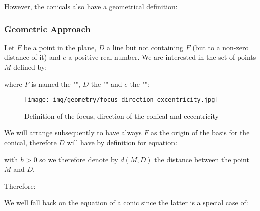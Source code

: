 	However, the conicals also have a geometrical definition:
	
	\pagebreak
	\subsubsection{Geometric Approach}
	Let $F$ be a point in the plane, $D$ a line but not containing $F$ (but to a non-zero distance of it) and $e$ a positive real number. We are interested in the set of points $M$ defined by:
	
	where $F$ is named the "", $D$ the "" and $e$ the "\label{eccentricity}":
	\begin{figure}[H]
		\centering
		\texttt{[image: img/geometry/focus\_direction\_excentricity.jpg]}
		\caption{Definition of the focus, direction of the conical and eccentricity}
	\end{figure}
	We will arrange subsequently to have always $F$ as the origin of the basis for the conical, therefore $D$ will have by definition for equation:
	
	with $h>0$ so we therefore denote by $d (M, D)$ the distance between the point $M$ and $D$.
	
	Therefore:
	
	We well fall back on the equation of a conic since the latter is a special case of:
	
